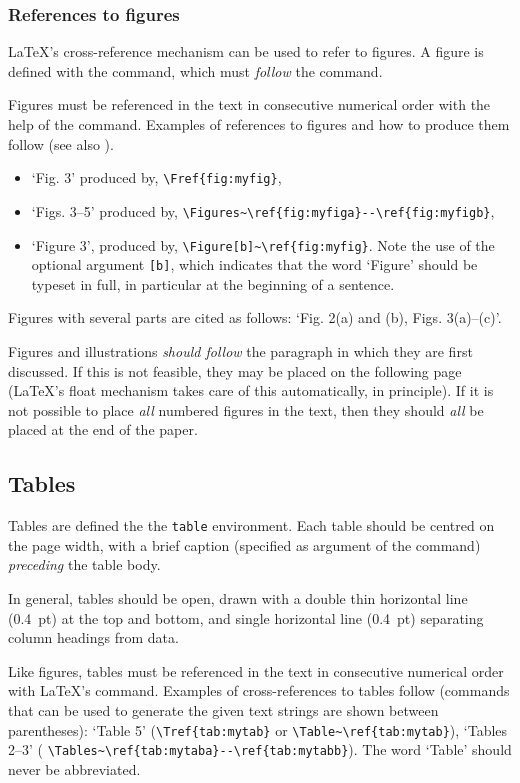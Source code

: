 \documentclass{cernrep}
\begin{document}
\subsubsection{References to figures}

\LaTeX's cross-reference mechanism can be used to refer to figures.  A
figure is defined with the  command, which must
\emph{follow} the  command.

Figures must be referenced in the text in consecutive numerical order
with the help of the  command. Examples of references to
figures and how to produce them follow (see also ).
\begin{itemize}
\item `Fig. 3' produced by, \eg \verb!\Fref{fig:myfig}!,
\item `Figs. 3--5' produced by, \eg
       \verb!\Figures~\ref{fig:myfiga}--\ref{fig:myfigb}!,
\item `Figure 3', produced by, \eg \verb!\Figure[b]~\ref{fig:myfig}!. 
       Note the use of the optional argument \texttt{[b]}, which
       indicates that the word `Figure' should be typeset in full,
       in particular at the beginning of a sentence.
\end{itemize}
Figures with several parts are cited as follows: `Fig. 2(a) and (b),
Figs. 3(a)--(c)'.

Figures and illustrations \emph{should follow} the paragraph in which
they are first discussed.  If this is not feasible, they may be placed
on the following page (\LaTeX{}'s float mechanism takes care of this
automatically, in principle). If it is not possible to place
\emph{all} numbered figures in the text, then they should \emph{all}
be placed at the end of the paper.

\subsection{Tables}

Tables are defined the the \texttt{table} environment.  Each table
should be centred on the page width, with a brief caption (specified
as argument of the  command) \emph{preceding} the table
body.

In general, tables should be open, drawn with a double thin horizontal
line (0.4~pt) at the top and bottom, and single horizontal line
(0.4~pt) separating column headings from data.

Like figures, tables must be referenced in the text in consecutive
numerical order with \LaTeX's  command. Examples of
cross-references to tables follow (commands that can be used to
generate the given text strings are shown between parentheses): `Table
5' (\eg \verb!\Tref{tab:mytab}! or \verb!\Table~\ref{tab:mytab}!),
`Tables 2--3' (\eg
\verb!\Tables~\ref{tab:mytaba}--\ref{tab:mytabb}!). The word `Table'
should never be abbreviated.
\end{document}
